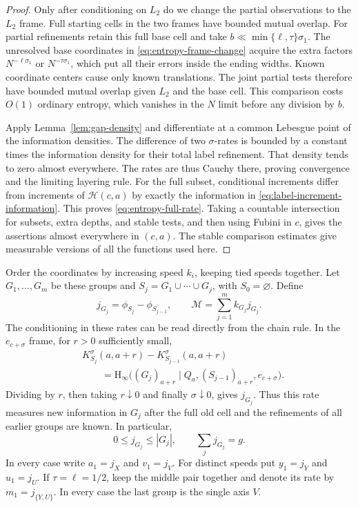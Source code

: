 \begin{proof}
Only after conditioning on $L_2$ do we change the partial observations
to the $L_2$ frame. Full starting cells in the two frames have bounded
mutual overlap. For partial refinements retain this full base cell and
take $b\ll\min\{\ell,\tau\}\sigma_1$. The unresolved base
coordinates in \eqref{eq:entropy-frame-change} acquire the extra
factors $N^{-\ell\sigma_1}$ or $N^{-\tau\sigma_1}$, which put
all their errors inside the ending widths. Known coordinate centers
cause only known translations. The joint partial tests therefore have
bounded mutual overlap given $L_2$ and the base cell. This comparison
costs $O(1)$ ordinary entropy, which vanishes in the $N$ limit before
any division by $b$.

Apply Lemma~\ref{lem:gap-density} and differentiate at a common
Lebesgue point of the information densities.  The difference of two
$\sigma$-rates is bounded by a constant times the information density
for their total label refinement.  That density tends to zero almost
everywhere.  The rates are thus Cauchy there, proving convergence and
the limiting layering rule.  For the full subset, conditional
increments differ from increments of $\mathscr H(c,a)$ by exactly
the information in \eqref{eq:label-increment-information}.  This proves
\eqref{eq:entropy-full-rate}.  Taking a countable intersection for
subsets, extra depths, and stable tests, and then using Fubini in $c$,
gives the assertions almost everywhere in $(c,a)$.  The stable
comparison estimates give measurable versions of all the functions
used here.
\end{proof}

Order the coordinates by increasing speed $k_i$, keeping tied speeds
together.  Let $G_1,\ldots,G_m$ be these groups and
$S_j=G_1\cup\cdots\cup G_j$, with $S_0=\varnothing$.  Define
\begin{equation}
 j_{G_j}=\phi_{S_j}-\phi_{S_{j-1}},\qquad
 \mathcal M=\sum_{j=1}^m k_{G_j}j_{G_j}.
 \label{eq:entropy-group-rates}
\end{equation}
The conditioning in these rates can be read directly from the chain
rule.  In the $e_{c+\sigma}$ frame, for $r>0$ sufficiently small,
\begin{align}
 &K_{S_j}^\sigma(a,a+r)-K_{S_{j-1}}^\sigma(a,a+r)\nonumber\\
 &\qquad=\mathrm H_\infty\bigl((G_j)_{a+r}\mid
             Q_a,(S_{j-1})_{a+r},e_{c+\sigma}\bigr).
 \label{eq:entropy-group-conditioning}
\end{align}
Dividing by $r$, then taking $r\downarrow0$ and finally
$\sigma\downarrow0$, gives $j_{G_j}$.  Thus this rate measures new
information in $G_j$ after the full old cell and the refinements of all
earlier groups are known.  In particular,
\begin{equation}
 0\le j_{G_j}\le|G_j|,\qquad \sum_j j_{G_j}=g.
 \label{eq:entropy-rate-bounds}
\end{equation}
In every case write $a_1=j_X$ and $v_1=j_V$.
For distinct speeds put $y_1=j_Y$ and $u_1=j_U$.
If $\tau=\ell=1/2$, keep the middle pair together and denote its
rate by $m_1=j_{\{Y,U\}}$. In every case the last group is the single axis $V$.

